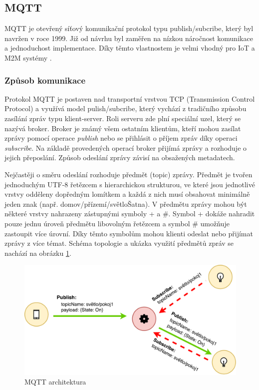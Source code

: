 \subsection{MQTT}
  MQTT je otevřený síťový komunikační protokol typu publish/subcribe, který byl navržen
  v roce 1999. Již od návrhu byl zaměřen na nízkou náročnost komunikace a jednoduchost
  implementace. Díky těmto vlastnostem je velmi vhodný pro IoT a M2M systémy \cite{mqtt}.
  \subsubsection{Způsob komunikace}
  
  Protokol MQTT je postaven nad transportní vrstvou TCP (Transmission Control Protocol)
  a využívá model pulish/subcribe, který vychází z tradičního způsobu zasílání zpráv
  typu klient-server. Roli serveru zde plní speciální uzel, který se nazývá broker.
  Broker je známý všem ostatním klientům, kteří mohou zasílat zprávy pomocí operace
  \textit{publish} nebo se přihlásit o příjem zpráv díky operaci \textit{subscribe}.
  Na základě provedených operací broker přijímá zprávy a rozhoduje o jejich přeposlání.
  Způsob odeslání zprávy závisí na obsažených metadatech.
  
  Nejčastěji o směru odeslání rozhoduje předmět (topic) zprávy. Předmět je tvořen
  jednoduchým UTF-8 řetězcem s hierarchickou strukturou, ve které jsou jednotlivé
  vrstvy odděleny dopředným lomítkem a každá z nich musí obsahovat minimálně jeden
  znak (např. domov/přízemí/světloŠatna). V předmětu
  zprávy mohou být některé vrstvy nahrazeny zástupnými symboly + a \#. Symbol + dokáže
  nahradit pouze jednu úroveň předmětu libovolným řetězcem a symbol \# umožňuje
  zastoupit více úrovní. Díky těmto symbolům mohou klienti odeslat nebo přijímat
  zprávy z více témat. Schéma topologie a ukázka využití předmětů zpráv se nachází na 
  obrázku \ref{obr.mqtt-arch}.
  
  \begin{figure}[ht]
\begin{center}
\includegraphics[scale=0.41]{pictures/mqtt-arch}
\caption{MQTT architektura}
\label{obr.mqtt-arch}
\end{center}
\end{figure}
  
